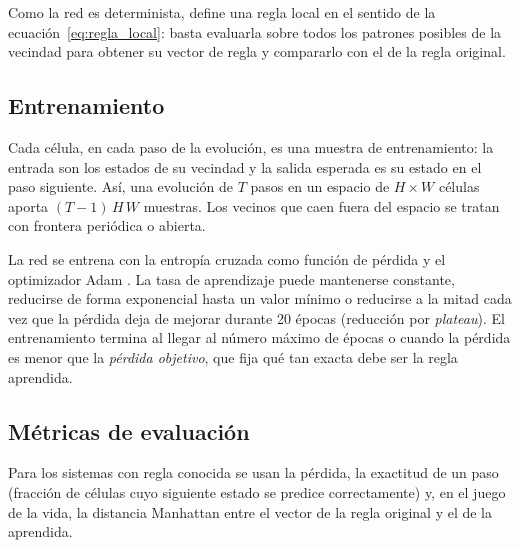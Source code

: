 Como la red es determinista, define una regla local en el sentido de la ecuación~\eqref{eq:regla_local}: basta evaluarla sobre todos los patrones posibles de la vecindad para obtener su vector de regla y compararlo con el de la regla original.

\subsection{Entrenamiento}

Cada célula, en cada paso de la evolución, es una muestra de entrenamiento: la entrada son los estados de su vecindad y la salida esperada es su estado en el paso siguiente. Así, una evolución de $T$ pasos en un espacio de $H \times W$ células aporta $(T-1)\,H\,W$ muestras. Los vecinos que caen fuera del espacio se tratan con frontera periódica o abierta.

La red se entrena con la entropía cruzada como función de pérdida y el optimizador Adam \cite{kingma2015_adam}. La tasa de aprendizaje puede mantenerse constante, reducirse de forma exponencial hasta un valor mínimo o reducirse a la mitad cada vez que la pérdida deja de mejorar durante 20 épocas (reducción por \textit{plateau}). El entrenamiento termina al llegar al número máximo de épocas o cuando la pérdida es menor que la \textit{pérdida objetivo}, que fija qué tan exacta debe ser la regla aprendida.

\subsection{Métricas de evaluación}

Para los sistemas con regla conocida se usan la pérdida, la exactitud de un paso (fracción de células cuyo siguiente estado se predice correctamente) y, en el juego de la vida, la distancia Manhattan entre el vector de la regla original y el de la aprendida.

